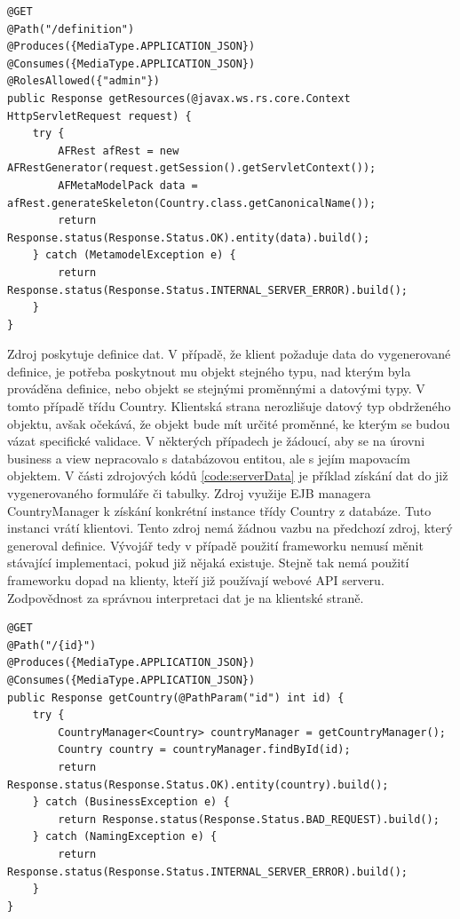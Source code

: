 \begin{lstlisting}[caption={Ukázka zdroje, sloužícího k vygenerování definice třídy Country},
label={code:serverDefinition}, basicstyle=\footnotesize]
@GET
@Path("/definition")
@Produces({MediaType.APPLICATION_JSON})
@Consumes({MediaType.APPLICATION_JSON})
@RolesAllowed({"admin"})
public Response getResources(@javax.ws.rs.core.Context HttpServletRequest request) {
	try {
		AFRest afRest = new AFRestGenerator(request.getSession().getServletContext());
		AFMetaModelPack data = afRest.generateSkeleton(Country.class.getCanonicalName());
		return Response.status(Response.Status.OK).entity(data).build();
	} catch (MetamodelException e) {
		return Response.status(Response.Status.INTERNAL_SERVER_ERROR).build();
	}
}
\end{lstlisting}
Zdroj poskytuje definice dat. V případě, že klient požaduje data do vygenerované definice, je potřeba poskytnout mu objekt stejného typu, nad kterým byla prováděna definice, nebo objekt se stejnými proměnnými a datovými typy. V tomto případě třídu Country. Klientská strana nerozlišuje datový typ obdrženého objektu, avšak očekává, že objekt bude mít určité proměnné, ke kterým se budou vázat specifické validace. V některých případech je žádoucí, aby se na úrovni business a view nepracovalo s databázovou entitou, ale s jejím mapovacím objektem. V části zdrojových kódů \ref{code:serverData} je příklad získání dat do již vygenerovaného formuláře či tabulky. Zdroj využije EJB \cite{javaEE} managera CountryManager k získání konkrétní instance třídy Country z databáze. Tuto instanci vrátí klientovi. Tento zdroj nemá žádnou vazbu na předchozí zdroj, který generoval definice. Vývojář tedy v případě použití frameworku nemusí měnit stávající implementaci, pokud již nějaká existuje. Stejně tak nemá použití frameworku dopad na klienty, kteří již používají webové API serveru. Zodpovědnost za správnou interpretaci dat je na klientské straně.
\begin{lstlisting}[caption=Zdroj poskytující konkrétní instanci třídy Country,
label={code:serverData}, basicstyle=\footnotesize]
@GET
@Path("/{id}")
@Produces({MediaType.APPLICATION_JSON})
@Consumes({MediaType.APPLICATION_JSON})
public Response getCountry(@PathParam("id") int id) {
	try {
		CountryManager<Country> countryManager = getCountryManager();
		Country country = countryManager.findById(id);
		return Response.status(Response.Status.OK).entity(country).build();
	} catch (BusinessException e) {
		return Response.status(Response.Status.BAD_REQUEST).build();
	} catch (NamingException e) {
		return Response.status(Response.Status.INTERNAL_SERVER_ERROR).build();
	}
}
\end{lstlisting}

